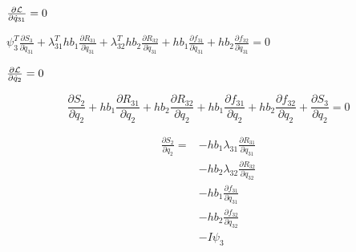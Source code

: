 \documentclass{beamer}
\newcommand{\pd}[2]{\frac{\partial #1}{\partial #2}}
\begin{document}
\begin{frame}[allowframebreaks]
  \framebreak

  \begin{block}{}\centering
    $\pd{{\cal L}}{\dot{q}_{31}}=0$
  \end{block}

  \begin{block}{}\centering
    $ 
      \psi_3^T \pd{S_3}{\dot{q}_{31}} 
      + \lambda_{31}^T hb_1\pd{R_{31}}{\dot{q}_{31}} 
      + \lambda_{32}^T hb_2\pd{R_{32}}{\dot{q}_{31}} 
      + hb_1\pd{f_{31}}{\dot{q}_{31}} 
      + hb_2\pd{f_{32}}{\dot{q}_{31}} = 0 
      $
  \end{block}

  \framebreak

  \begin{block}{}\centering
    $\pd{{\cal L}}{\dot{q}_{2}}=0$
  \end{block}

  \begin{block}{}\centering
    \begin{equation}\nonumber
      \pd{S_2}{{q}_{2}}    + hb_1\pd{R_{31}}{q_2} + hb_2 \pd{R_{32}}{q_2} +
      hb_1\pd{f_{31}}{q_2} + hb_2\pd{f_{32}}{q_2} +\pd{S_3}{q_2} = 0
    \end{equation}
  \end{block}

  \begin{block}{}\centering
    \begin{equation}\nonumber
      \begin{split}
        \pd{S_2}{q_2}  =  & - hb_1\lambda_{31} \pd{R_{31}}{q_{31}} \\
        &- hb_2 \lambda_{32} \pd{R_{32}}{q_{32}} \\
        &- hb_1\pd{f_{31}}{q_{31}} \\ 
        &- hb_2\pd{f_{32}}{q_{32}} \\ 
        &- I \psi_3
      \end{split}
    \end{equation}
  \end{block}

\end{frame}
\end{document}
